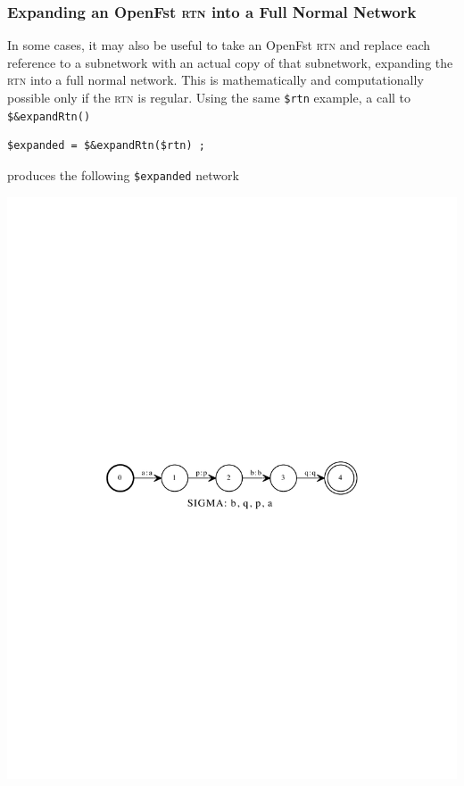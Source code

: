 \documentclass[letterpaper,12pt]{article}
\newcommand{\acro}{\textsc}
\begin{document}
\subsubsection{Expanding an OpenFst \acro{rtn} into a Full Normal Network}

In some cases, it may also be useful to take an OpenFst \acro{rtn} and replace
each reference to a subnetwork with an actual copy of that subnetwork,
expanding the \acro{rtn} into a full normal network.  This is mathematically and
computationally possible only if the \acro{rtn} is regular.  Using the same
\verb!$rtn! example, a call to \verb!$&expandRtn()!

\begin{Verbatim}[fontsize=\small]
$expanded = $&expandRtn($rtn) ;
\end{Verbatim}

\noindent
produces the following \verb!$expanded! network

\begin{center}
\includegraphics[width=\textwidth]{images/expanded.pdf}
\end{center}
\end{document}
